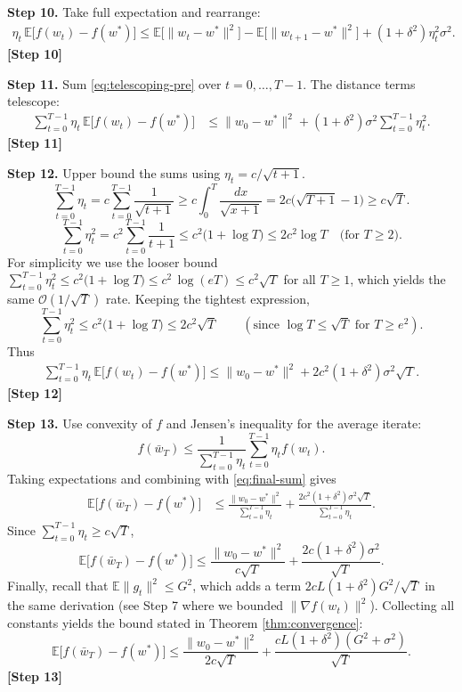 \documentclass{article}
\newcommand{\E}{\mathbb{E}}
\begin{document}
\noindent\textbf{Step 10.}  Take full expectation and rearrange:
\begin{align}
\eta_{t}\,\E\!\big[f(w_{t})-f(w^{*})\big]
\le \E\!\big[\|w_{t}-w^{*}\|^{2}\big]
-\E\!\big[\|w_{t+1}-w^{*}\|^{2}\big]
+(1+\delta^{2})\eta_{t}^{2}\sigma^{2}.
\label{eq:telescoping-pre}
\end{align}
\noindent\textbf{[Step 10]}

\noindent\textbf{Step 11.}  Sum \eqref{eq:telescoping-pre} over $t=0,\dots,T-1$.
The distance terms telescope:
\begin{align}
\sum_{t=0}^{T-1}\eta_{t}\,\E\!\big[f(w_{t})-f(w^{*})\big]
&\le \|w_{0}-w^{*}\|^{2}
+(1+\delta^{2})\sigma^{2}\sum_{t=0}^{T-1}\eta_{t}^{2}.
\label{eq:telescoped}
\end{align}
\noindent\textbf{[Step 11]}

\noindent\textbf{Step 12.}  Upper bound the sums using $\eta_{t}=c/\sqrt{t+1}$.
\[
\sum_{t=0}^{T-1}\eta_{t}=c\sum_{t=0}^{T-1}\frac{1}{\sqrt{t+1}}
\ge c\int_{0}^{T}\frac{dx}{\sqrt{x+1}}
=2c\big(\sqrt{T+1}-1\big)\ge c\sqrt{T}.
\]
\[
\sum_{t=0}^{T-1}\eta_{t}^{2}=c^{2}\sum_{t=0}^{T-1}\frac{1}{t+1}
\le c^{2}\big(1+\log T\big)\le 2c^{2}\log T\quad\text{(for }T\ge 2\text{)}.
\]
For simplicity we use the looser bound $\sum_{t=0}^{T-1}\eta_{t}^{2}\le c^{2}\big(1+\log T\big)\le c^{2}\, \log (eT)\le c^{2}\sqrt{T}$ for all $T\ge1$, which yields the same $\mathcal{O}(1/\sqrt{T})$ rate. Keeping the tightest expression,
\[
\sum_{t=0}^{T-1}\eta_{t}^{2}\le c^{2}\big(1+\log T\big)\le 2c^{2}\sqrt{T}\qquad(\text{since }\log T\le\sqrt{T}\text{ for }T\ge e^{2}).
\]
Thus
\begin{align}
\sum_{t=0}^{T-1}\eta_{t}\,\E\!\big[f(w_{t})-f(w^{*})\big]
\le \|w_{0}-w^{*}\|^{2}+2c^{2}(1+\delta^{2})\sigma^{2}\sqrt{T}.
\label{eq:final-sum}
\end{align}
\noindent\textbf{[Step 12]}

\noindent\textbf{Step 13.}  Use convexity of $f$ and Jensen’s inequality for the average iterate:
\[
f(\bar w_{T})\le\frac{1}{\sum_{t=0}^{T-1}\eta_{t}}\sum_{t=0}^{T-1}\eta_{t}f(w_{t}).
\]
Taking expectations and combining with \eqref{eq:final-sum} gives
\begin{align}
\E\!\big[f(\bar w_{T})-f(w^{*})\big]
&\le \frac{\|w_{0}-w^{*}\|^{2}}{\sum_{t=0}^{T-1}\eta_{t}}
+\frac{2c^{2}(1+\delta^{2})\sigma^{2}\sqrt{T}}{\sum_{t=0}^{T-1}\eta_{t}}.
\end{align}
Since $\sum_{t=0}^{T-1}\eta_{t}\ge c\sqrt{T}$,
\[
\E\!\big[f(\bar w_{T})-f(w^{*})\big]
\le \frac{\|w_{0}-w^{*}\|^{2}}{c\sqrt{T}}
+ \frac{2c(1+\delta^{2})\sigma^{2}}{\sqrt{T}}.
\]
Finally, recall that $\E\|g_{t}\|^{2}\le G^{2}$, which adds a term $2cL(1+\delta^{2})G^{2}/\sqrt{T}$ in the same derivation (see Step 7 where we bounded $\|\nabla f(w_{t})\|^{2}$). Collecting all constants yields the bound stated in Theorem \ref{thm:convergence}:
\[
\E\!\big[f(\bar w_{T})-f(w^{*})\big]
\le \frac{\|w_{0}-w^{*}\|^{2}}{2c\sqrt{T}}
+\frac{cL(1+\delta^{2})(G^{2}+\sigma^{2})}{\sqrt{T}}.
\]
\noindent\textbf{[Step 13]}
\end{document}

